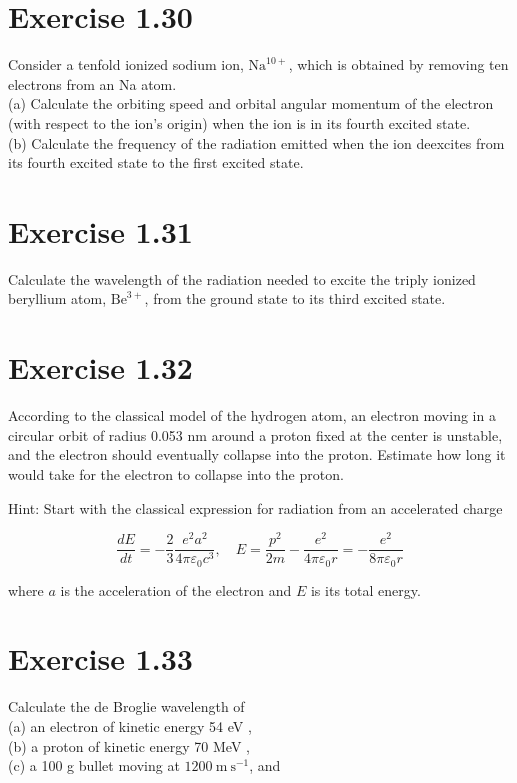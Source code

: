 \documentclass[10pt]{article}
\begin{document}
\section*{Exercise 1.30}
Consider a tenfold ionized sodium ion, $\mathrm{Na}^{10+}$, which is obtained by removing ten electrons from an Na atom.\\
(a) Calculate the orbiting speed and orbital angular momentum of the electron (with respect to the ion's origin) when the ion is in its fourth excited state.\\
(b) Calculate the frequency of the radiation emitted when the ion deexcites from its fourth excited state to the first excited state.

\section*{Exercise 1.31}
Calculate the wavelength of the radiation needed to excite the triply ionized beryllium atom, $\mathrm{Be}^{3+}$, from the ground state to its third excited state.

\section*{Exercise 1.32}
According to the classical model of the hydrogen atom, an electron moving in a circular orbit of radius 0.053 nm around a proton fixed at the center is unstable, and the electron should eventually collapse into the proton. Estimate how long it would take for the electron to collapse into the proton.

Hint: Start with the classical expression for radiation from an accelerated charge

$$
\frac{d E}{d t}=-\frac{2}{3} \frac{e^{2} a^{2}}{4 \pi \varepsilon_{0} c^{3}}, \quad E=\frac{p^{2}}{2 m}-\frac{e^{2}}{4 \pi \varepsilon_{0} r}=-\frac{e^{2}}{8 \pi \varepsilon_{0} r}
$$

where $a$ is the acceleration of the electron and $E$ is its total energy.

\section*{Exercise 1.33}
Calculate the de Broglie wavelength of\\
(a) an electron of kinetic energy 54 eV ,\\
(b) a proton of kinetic energy 70 MeV ,\\
(c) a 100 g bullet moving at $1200 \mathrm{~m} \mathrm{~s}^{-1}$, and
\end{document}

